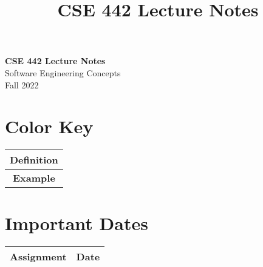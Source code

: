 \documentclass[11pt]{lectures}
\begin{document}
\setcounter{section}{0}
\title{CSE 442 Lecture Notes}

\thispagestyle{empty}

\begin{center}
{\LARGE \bf CSE 442 Lecture Notes}\\
{\large Software Engineering Concepts}\\
Fall 2022
\end{center}

\begin{multicols}{2}
\section*{Color Key}
\begin{tabular}{|c|}
    \hline
     \colorbox{defn}{\textbf{Definition}}\\
     \hline
     \colorbox{exam}{\textbf{Example}}\\
     \hline
\end{tabular}

\section*{Important Dates}
\begin{tabular}{|c||c|}
    \hline
    \textbf{Assignment} & \textbf{Date} \\
    \hline
    \hline
    \hline
\end{tabular}
\end{multicols}
\end{document}
